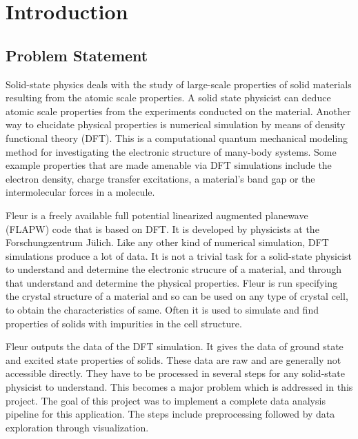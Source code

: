 
\chapter{Introduction}
\label{chap:intro}

\section{Problem Statement}
\label{sec:problem-statement}

Solid-state physics deals with the study of large-scale properties of solid materials resulting from the atomic scale properties. A solid state physicist can deduce atomic scale properties from the experiments conducted on the material. Another way to elucidate physical properties is numerical simulation by means of density functional theory (DFT). This is a computational quantum mechanical modeling method for investigating the electronic structure of many-body systems. Some example properties that are made amenable via DFT simulations include the electron density, charge transfer excitations, a material's band gap or the intermolecular forces in a molecule.

Fleur is a freely available full potential linearized augmented planewave (FLAPW) code that is based on DFT\cite{fleur}. It is developed by physicists at the Forschungzentrum Jülich. Like any other kind of numerical simulation, DFT simulations produce a lot of data. It is not a trivial task for a solid-state physicist to understand and determine the electronic strucure of a material, and through that understand and determine the physical properties. Fleur is run specifying the crystal structure of a material and so can be used on any type of crystal cell, to obtain the characteristics of same. Often it is used to simulate and find properties of solids with impurities in the cell structure.

Fleur outputs the data of the DFT simulation. It gives the data of ground state and excited state properties of solids. These data are raw and are generally not accessible directly. They have to be processed in several steps for any solid-state physicist to understand. This becomes a major problem which is addressed in this project. The goal of this project was to implement a complete data analysis pipeline for this application. The steps include preprocessing followed by data exploration through visualization.


